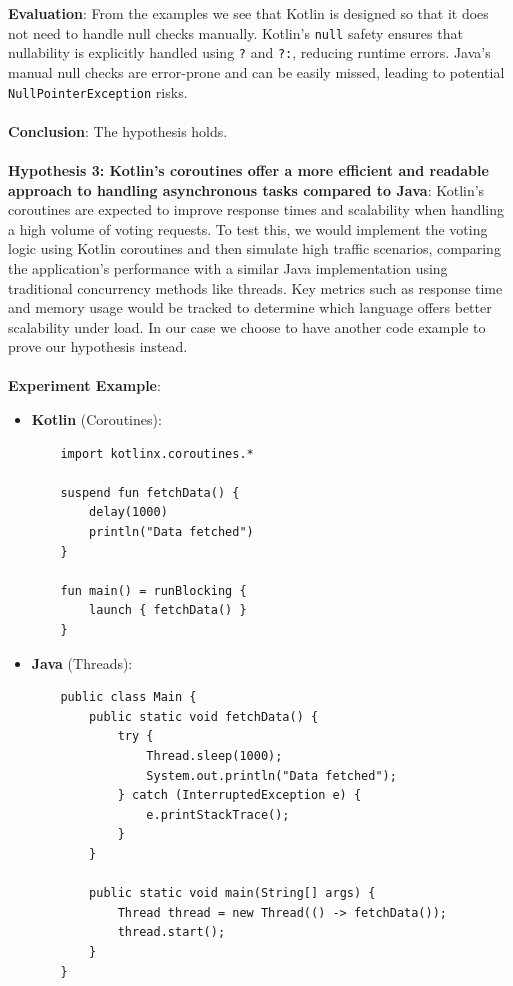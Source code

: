 \textbf{Evaluation}: From the examples we see that Kotlin is designed so that it does not need to handle null checks manually. Kotlin’s \texttt{null} safety ensures that nullability is explicitly handled using \texttt{?} and \texttt{?:}, reducing runtime errors. Java’s manual null checks are error-prone and can be easily missed, leading to potential \texttt{NullPointerException} risks.
\\
\\
\textbf{Conclusion}: The hypothesis holds. 
\\
\\
\textbf{Hypothesis 3: Kotlin's coroutines offer a more efficient and readable approach to handling asynchronous tasks compared to Java}: Kotlin's coroutines are expected to improve response times and scalability when handling a high volume of voting requests. To test this, we would implement the voting logic using Kotlin coroutines and then simulate high traffic scenarios, comparing the application’s performance with a similar Java implementation using traditional concurrency methods like threads. Key metrics such as response time and memory usage would be tracked to determine which language offers better scalability under load. In our case we choose to have another code example to prove our hypothesis instead. 
\\
\\
\textbf{Experiment Example}:
\begin{itemize}
    \item \textbf{Kotlin} (Coroutines):
    \begin{verbatim}
    import kotlinx.coroutines.*

    suspend fun fetchData() {
        delay(1000)
        println("Data fetched")
    }

    fun main() = runBlocking {
        launch { fetchData() }
    }
    \end{verbatim}
    
    \item \textbf{Java} (Threads):
    \begin{verbatim}
    public class Main {
        public static void fetchData() {
            try {
                Thread.sleep(1000);
                System.out.println("Data fetched");
            } catch (InterruptedException e) {
                e.printStackTrace();
            }
        }

        public static void main(String[] args) {
            Thread thread = new Thread(() -> fetchData());
            thread.start();
        }
    }
    \end{verbatim}
\end{itemize}

